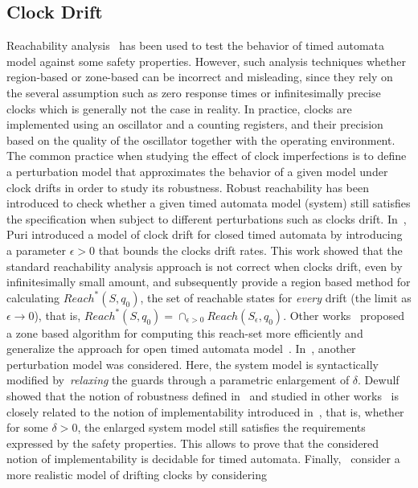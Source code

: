 \subsection{Clock Drift}

Reachability analysis~\cite{} has been used to test the behavior
of timed automata model against some safety properties. However, such analysis
techniques whether region-based or zone-based can be incorrect and misleading,
since they rely on the several assumption such as zero response times or infinitesimally  
precise clocks which is generally not the case in reality. In practice, clocks are 
implemented using an oscillator and a counting registers, and their precision based on 
the quality of the oscillator together with the operating environment.
The common practice when studying the effect of clock imperfections is to define a perturbation
model that approximates the behavior of a given model under clock drifts in order to study its 
robustness. 
Robust reachability has been introduced to check whether a given
timed automata model (system) still satisfies the specification when
subject to different perturbations such as clocks drift.
In~\cite{drift:puri}, Puri introduced a model of clock drift for closed timed automata
by introducing a parameter $\epsilon>0$ that bounds the clocks drift rates.
This work showed that the standard reachability analysis approach is not correct
when clocks drift, even by infinitesimally small amount, and subsequently provide a region based
method for calculating $Reach^*(S,q_0)$, the set of reachable states for \emph{every} drift 
(the limit as $\epsilon\to 0$),
that is, $Reach^*(S,q_0)=\cap_{\epsilon>0} Reach(S_{\epsilon},q_0)$. Other 
works~\cite{drift:conrad,drift:puriR} proposed a zone based algorithm for computing this 
reach-set more efficiently and generalize the approach for open timed automata 
model~\cite{drift:puriR}.
In~\cite{drift:wulf,drift:puri}, another perturbation model was considered. Here, 
the system model is syntactically modified by~\emph{relaxing} the guards through 
a parametric enlargement of $\delta$.
Dewulf~\cite{drift:wulf} showed that the notion of robustness defined in~\cite{drift:puri} and
studied in other works~\cite{drift:conrad, drift:puriR} is closely related to the notion of 
implementability introduced in~\cite{drift:wulf}, that is, whether for some $\delta>0$,
the enlarged system model still satisfies the requirements expressed by the safety properties.
This allows to prove that the considered notion of implementability is decidable 
for timed automata.
Finally,~\cite{drift:surp} consider a more realistic model of drifting clocks by considering 
